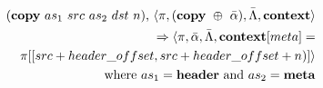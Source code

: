 \begin{equation}
\begin{split}
  (\textrm{\textbf{copy}} \ as_1 \ src \ as_2 \ dst \ n)
  \textrm{,} \ \langle \pi, (\textrm{\textbf{copy}} \ \oplus \ \bar \alpha), \bar \Lambda, \textrm{\textbf{context}} \rangle \\
  \Rightarrow
  \langle \pi, \bar \alpha, \bar \Lambda, \textrm{\textbf{context}}[meta] = \\ \pi[[src + header\_offset, src + header\_offset + n)] \rangle \\
    \textrm{where} \ as_1 = \textrm{\textbf{header} and } as_2 =
    \textrm{\textbf{meta}}
\end{split}
\end{equation}
